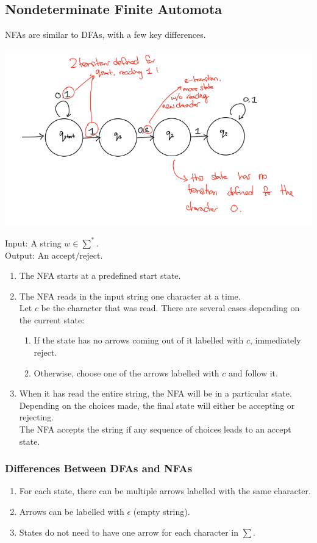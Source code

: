 \documentclass{article}
\begin{document}
    \subsection{Nondeterminate Finite Automota}
    NFAs are similar to DFAs, with a few key differences.
    \begin{center}
        \includegraphics[scale=0.6]{imgs/nfa-labeled.png}
    \end{center}
    Input: A string $w \in \sum^*$.\\
    Output: An accept/reject.
    \begin{enumerate}
        \item The NFA starts at a predefined start state.
        \item The NFA reads in the input string one character at a time.\\
        Let $c$ be the character that was read. There are several cases depending on the current state:
        \begin{enumerate}
            \item If the state has no arrows coming out of it labelled with $c$, immediately reject.
            \item Otherwise, choose one of the arrows labelled with $c$ and follow it.
        \end{enumerate}
        \item When it has read the entire string, the NFA will be in a particular state. Depending on the choices made, the final state will either be accepting or rejecting.\\
        The NFA accepts the string if any sequence of choices leads to an accept state.
    \end{enumerate}
    
    \subsubsection{Differences Between DFAs and NFAs}
    \begin{enumerate}
        \item For each state, there can be multiple arrows labelled with the same character.
        \item Arrows can be labelled with $\epsilon$ (empty string).
        \item States do not need to have one arrow for each character in $\sum$.
    \end{enumerate}
    
\end{document}
